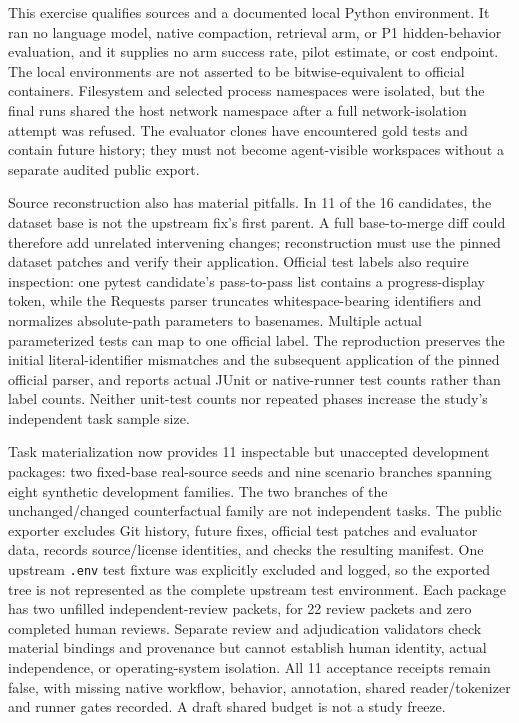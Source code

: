 This exercise qualifies sources and a documented local Python
environment. It ran no language model, native compaction, retrieval arm,
or P1 hidden-behavior evaluation, and it supplies no arm success rate,
pilot estimate, or cost endpoint. The local environments are not
asserted to be bitwise-equivalent to official containers. Filesystem and
selected process namespaces were isolated, but the final runs shared the
host network namespace after a full network-isolation attempt was
refused. The evaluator clones have encountered gold tests and contain
future history; they must not become agent-visible workspaces without a
separate audited public export.

Source reconstruction also has material pitfalls. In 11 of the 16
candidates, the dataset base is not the upstream fix's first parent. A
full base-to-merge diff could therefore add unrelated intervening
changes; reconstruction must use the pinned dataset patches and verify
their application. Official test labels also require inspection: one
pytest candidate's pass-to-pass list contains a progress-display token,
while the Requests parser truncates whitespace-bearing identifiers and
normalizes absolute-path parameters to basenames. Multiple actual
parameterized tests can map to one official label. The reproduction
preserves the initial literal-identifier mismatches and the subsequent
application of the pinned official parser, and reports actual JUnit or
native-runner test counts rather than label counts. Neither unit-test
counts nor repeated phases increase the study's independent task sample
size.

Task materialization now provides 11 inspectable but unaccepted
development packages: two fixed-base real-source seeds and nine scenario
branches spanning eight synthetic development families. The two branches
of the unchanged/changed counterfactual family are not independent
tasks. The public exporter excludes Git history, future fixes, official
test patches and evaluator data, records source/license identities, and
checks the resulting manifest. One upstream \texttt{.env} test fixture
was explicitly excluded and logged, so the exported tree is not
represented as the complete upstream test environment. Each package has
two unfilled independent-review packets, for 22 review packets and zero
completed human reviews. Separate review and adjudication validators
check material bindings and provenance but cannot establish human
identity, actual independence, or operating-system isolation. All 11
acceptance receipts remain false, with missing native workflow,
behavior, annotation, shared reader/tokenizer and runner gates recorded.
A draft shared budget is not a study freeze.

